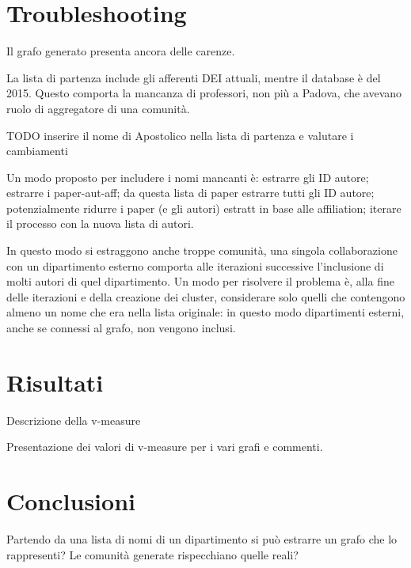 \documentclass[12pt,a4paper,twoside]{report}
\begin{document}


\whitePage
\chapter{Troubleshooting} \label{cap:trouble}
Il grafo generato presenta ancora delle carenze.

La lista di partenza include gli afferenti DEI attuali, mentre il database è del 2015. Questo comporta la mancanza di professori, non più a Padova, che avevano ruolo di aggregatore di una comunità.

TODO inserire il nome di Apostolico nella lista di partenza e valutare i cambiamenti

Un modo proposto per includere i nomi mancanti è: estrarre gli ID autore; estrarre i paper-aut-aff; da questa lista di paper estrarre tutti gli ID autore; potenzialmente ridurre i paper (e gli autori) estratt in base alle affiliation; iterare il processo con la nuova lista di autori.

In questo modo si estraggono anche troppe comunità, una singola collaborazione con un dipartimento esterno comporta alle iterazioni successive l'inclusione di molti autori di quel dipartimento. Un modo per risolvere il problema è, alla fine delle iterazioni e della creazione dei cluster, considerare solo quelli che contengono almeno un nome che era nella lista originale: in questo modo dipartimenti esterni, anche se connessi al grafo, non vengono inclusi.



\whitePage
\chapter{Risultati} \label{cap:risultati}
Descrizione della v-measure

Presentazione dei valori di v-measure per i vari grafi e commenti.



\whitePage
\chapter{Conclusioni} \label{cap:conclusioni}
Partendo da una lista di nomi di un dipartimento si può estrarre un grafo che lo rappresenti? Le comunità generate rispecchiano quelle reali?




\nocite{*} %

\end{document}
